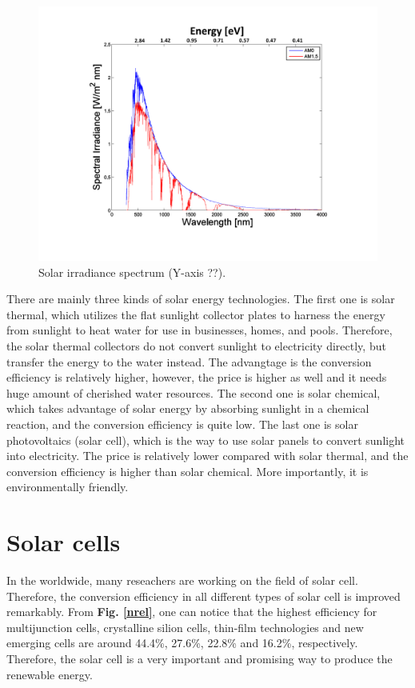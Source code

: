 \documentclass[a4paper, 12pt, titlepage,oneside,drop]{kthesis}
\begin{document}
\begin{figure}[H]
\centering
\includegraphics[scale=0.4]{spectrum.pdf}
\caption{Solar irradiance spectrum (Y-axis ??).}
\label{spectrumsun}
\end{figure}

There are mainly three kinds of solar energy technologies. The first one is solar thermal,
which utilizes the flat sunlight collector plates to harness the energy from sunlight to heat water for use in businesses, homes, and pools.
Therefore, the solar thermal collectors do not convert sunlight to electricity directly, but transfer the energy to the water instead. The advangtage is the conversion efficiency 
is relatively higher, however, the price is higher as well and it needs huge amount of cherished water resources. The second one is solar chemical, which takes advantage of solar 
energy by absorbing sunlight in a chemical reaction, and the conversion efficiency is quite low. The last one is solar photovoltaics (solar cell), which is the way
to use solar panels to convert sunlight into electricity. The price is relatively lower compared with solar thermal, and the conversion efficiency is higher than solar chemical. More importantly, it is
environmentally friendly.


\section{Solar cells}
In the worldwide, many reseachers are working on the field of solar cell. Therefore, the conversion efficiency in all different types of solar cell is improved remarkably. 
From \textbf{Fig. \ref{nrel}}, one can notice that the highest efficiency for multijunction cells, crystalline silion cells, thin-film technologies and new emerging cells are around 
44.4\%, 27.6\%, 22.8\% and 16.2\%, respectively. Therefore, the solar cell is a very important and promising way to produce the renewable energy.
\end{document}

